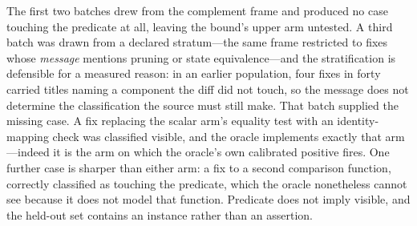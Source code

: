 The first two batches drew from the complement frame and produced no case touching
the predicate at all, leaving the bound's upper arm untested. A third batch was
drawn from a declared stratum---the same frame restricted to fixes whose
\emph{message} mentions pruning or state equivalence---and the stratification is
defensible for a measured reason: in an earlier population, four fixes in forty
carried titles naming a component the diff did not touch, so the message does not
determine the classification the source must still make. That batch supplied the
missing case. A fix replacing the scalar arm's equality test with an
identity-mapping check was classified visible, and the oracle implements exactly
that arm---indeed it is the arm on which the oracle's own calibrated positive
fires. One further case is sharper than either arm: a fix to a second comparison
function, correctly classified as touching the predicate, which the oracle
nonetheless cannot see because it does not model that function. Predicate does not
imply visible, and the held-out set contains an instance rather than an
assertion.

